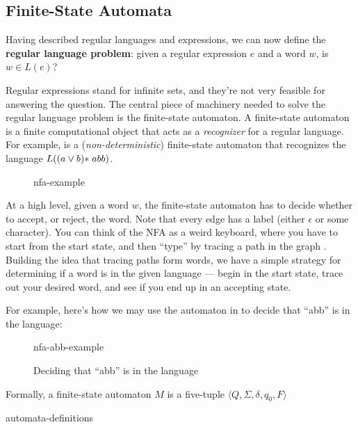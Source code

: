 \subsection{Finite-State Automata}
Having described regular languages and expressions, we can now define the \textbf{regular language problem}: given a regular expression $e$ and a word $w$, is $w \in L(e)$?

Regular expressions stand for infinite sets, and they're not very feasible for answering the question. The central piece of machinery needed to solve the regular language problem is the finite-state automaton. A finite-state automaton is a finite computational object that acts as a \emph{recognizer} for a regular language. For example,  is a (\emph{non-deterministic}) finite-state automaton that recognizes the language $L((a \lor b)\* abb)$. 

\begin{figure}[H]
    \centering
    {nfa-example}
    \label{fig:nfa-example}
\end{figure}

At a high level, given a word $w$, the finite-state automaton has to decide whether to accept, or reject, the word. Note that every edge has a label (either $\epsilon$ or some character). You can think of the NFA as a weird keyboard, where you have to start from the start state, and then ``type'' by tracing a path in the graph . Building the idea that tracing paths form words, we have a simple strategy for determining if a word is in the given language --- begin in the start state, trace out your desired word, and see if you end up in an accepting state. 

For example, here's how we may use the automaton in  to decide that ``abb'' is in the language:\par

\begin{figure}[H]
    \begin{center}
    {nfa-abb-example}
    \end{center}
    \caption{Deciding that ``abb'' is in the language}
    \label{fig:nfa-decision}
\end{figure}

Formally, a finite-state automaton $M$ is a five-tuple $\langle Q, \Sigma, \delta, q_0, F \rangle$

\begin{center}
{automata-definitions}
\end{center}


